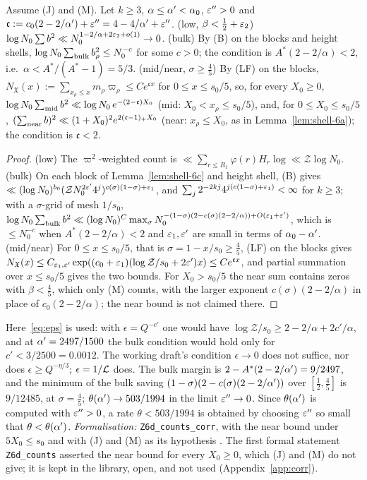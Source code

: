 \begin{lemma}\label{lem:shell-6d}
Assume \textup{(J)} and \textup{(M)}. Let $k\ge3$, $\alpha\le\alpha'<\alpha_0$, $\varepsilon''>0$ and $\mathfrak c:=c_0(2-2/\alpha')+\varepsilon''=4-4/\alpha'+\varepsilon''$.
\textup{(low, $\beta<\frac12+\varepsilon_2$)} $\log N_0\sum b^2\ll N_0^{1-2/\alpha+2\varepsilon_2+o(1)}\to0$.
\textup{(bulk)} By (B) on the blocks and height shells, $\log N_0\sum_{\rm bulk}b_\rho^2\le N_0^{-c}$ for some $c>0$; the condition is $A^*(2-2/\alpha)<2$, i.e.\
$\alpha<A^*/(A^*-1)=5/3$.
\textup{(mid/near, $\sigma\ge\frac45$)} By (LF) on the blocks, $N_{\mathfrak X}(x):=\sum_{x_\rho\le x}m_\rho\varpi_\rho\le Ce^{\mathfrak cx}$ for
$0\le x\le s_0/5$, so, for every $X_0\ge0$, $\log N_0\sum_{\rm mid}b^2\ll\log N_0\,e^{-(2-\mathfrak c)X_0}$ (mid: $X_0<x_\rho\le s_0/5$), and, for
$0\le X_0\le s_0/5$, $(\sum_{\rm near}b)^2\ll(1+X_0)^2e^{2(\mathfrak c-1)_+X_0}$ (near: $x_\rho\le X_0$, as in Lemma~\ref{lem:shell-6a}); the condition
is $\mathfrak c<2$.
\end{lemma}
\begin{proof}
(low) The $\varpi^2$-weighted count is $\ll\sum_{r\le R_1}\varphi(r)H_r\log\ll\mathcal Z\log N_0$. (bulk) On each block of Lemma~\ref{lem:shell-6c} and height shell,
(B) gives $\ll(\log N_0)^{b_0}(\mathcal ZN_0^{2\varepsilon'}4^j)^{c(\sigma)(1-\sigma)+\varepsilon_1}$, and $\sum_j2^{-2kj}4^{j(c(1-\sigma)+\varepsilon_1)}<\infty$ for $k\ge3$; with a $\sigma$-grid of mesh $1/s_0$,
$\log N_0\sum_{\rm bulk}b^2\ll(\log N_0)^{C}\max_\sigma N_0^{-(1-\sigma)(2-c(\sigma)(2-2/\alpha))+O(\varepsilon_1+\varepsilon')}$, which is $\le N_0^{-c}$ when $A^*(2-2/\alpha)<2$ and $\varepsilon_1,\varepsilon'$
are small in terms of $\alpha_0-\alpha'$. (mid/near) For $0\le x\le s_0/5$, that is $\sigma=1-x/s_0\ge\frac45$, (LF) on the blocks gives
$N_{\mathfrak X}(x)\le C_{\varepsilon_1,\varepsilon'}\exp((c_0+\varepsilon_1)(\log\mathcal Z/s_0+2\varepsilon')x)\le Ce^{\mathfrak cx}$, and partial summation over $x\le s_0/5$ gives the two
bounds. For $X_0>s_0/5$ the near sum contains zeros with $\beta<\frac45$, which only (M) counts, with the larger exponent $c(\sigma)(2-2/\alpha)$ in
place of $c_0(2-2/\alpha)$; the near bound is not claimed there.
\end{proof}
Here~\eqref{eq:eps} is used: with $\epsilon=Q^{-c'}$ one would have $\log\mathcal Z/s_0\ge2-2/\alpha+2c'/\alpha$, and at $\alpha'=2497/1500$ the bulk condition would hold
only for $c'<3/2500=0.0012$. The working draft's condition $\epsilon\to0$ does not suffice, nor does $\epsilon\ge Q^{-\eta/3}$; $\epsilon=1/\mathcal L$
does. The bulk margin is $2-A^*(2-2/\alpha')=9/2497$, and the minimum of the bulk saving $(1-\sigma)(2-c(\sigma)(2-2/\alpha'))$ over
$[\frac12,\frac45]$ is $9/12485$, at $\sigma=\frac45$; $\theta(\alpha')\to503/1994$ in the limit $\varepsilon''\to0$. Since $\theta(\alpha')$ is
computed with $\varepsilon''>0$, a rate $\theta<503/1994$ is obtained by choosing $\varepsilon''$ so small that $\theta<\theta(\alpha')$. \emph{Formalisation:}
\texttt{Z6d\_counts\_corr}, with the near bound under $5X_0\le s_0$ and with (J) and (M) as its hypothesis \tagL. The
first formal statement \texttt{Z6d\_counts} asserted the near bound for every $X_0\ge0$, which
(J) and (M) do not give; it is kept in the library, open, and not used (Appendix~\ref{app:corr}).


